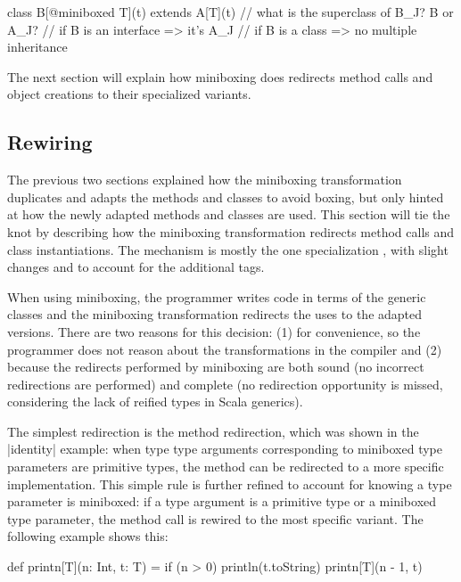 \begin{lstlisting-nobreak}
 class B[@miniboxed T](t) extends A[T](t)
 // what is the superclass of B_J? B or A_J?
 // if B is an interface => it's A_J
 // if B is a class => no multiple inheritance
\end{lstlisting-nobreak}

The next section will explain how miniboxing does redirects method calls and object creations to their specialized variants.

\subsection{Rewiring}

The previous two sections explained how the miniboxing transformation duplicates and adapts the methods and classes to avoid boxing, but only hinted at how the newly adapted methods and classes are used. This section will tie the knot by describing how the miniboxing transformation redirects method calls and class instantiations. The mechanism is mostly the one specialization \cite{iuli-thesis, specialization-iuli}, with slight changes and to account for the additional tags.

When using miniboxing, the programmer writes code in terms of the generic classes and the miniboxing transformation redirects the uses to the adapted versions. There are two reasons for this decision: (1) for convenience, so the programmer does not reason about the transformations in the compiler and (2) because the redirects performed by miniboxing are both sound (no incorrect redirections are performed) and complete (no redirection opportunity is missed, considering the lack of reified types \cite{michel-thesis, dot-net-generics, dot-net-generics-form} in Scala generics).

The simplest redirection is the method redirection, which was shown in the |identity| example: when type type arguments corresponding to miniboxed type parameters are primitive types, the method can be redirected to a more specific implementation. This simple rule is further refined to account for knowing a type parameter is miniboxed: if a type argument is a primitive type or a miniboxed type parameter, the method call is rewired to the most specific variant. The following example shows this:

\begin{lstlisting-nobreak}
 def printn[T](n: Int, t: T) =
   if (n > 0) {
     println(t.toString)
     printn[T](n - 1, t)
   }
\end{lstlisting-nobreak}

